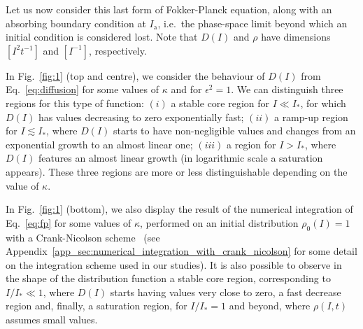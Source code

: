 Let us now consider this last form of Fokker-Planck equation, along with an absorbing boundary condition at $I_{\mathrm{a}}$, i.e.\ the phase-space limit beyond which an initial condition is considered lost. Note that $D(I)$ and $\rho$ have dimensions $[I^2t^{-1}]$ and $[I^{-1}]$, respectively.

In Fig.~\ref{fig:1} (top and centre), we consider the behaviour of $D(I)$ from Eq.~\eqref{eq:diffusion} for some values of $\kappa$ and for $\epsilon^2 = 1$. We can distinguish three regions for this type of function: $(i)$ a stable core region for $I \ll I_\ast$, for which $D(I)$ has values decreasing to zero exponentially fast; $(ii)$ a ramp-up region for $I \lesssim I_\ast$, where $D(I)$ starts to have non-negligible values and changes from an exponential growth to an almost linear one; $(iii)$ a region for $I >  I_\ast$, where $D(I)$ features an almost linear growth (in logarithmic scale a saturation appears). These three regions are more or less distinguishable depending on the value of $\kappa$. 

In Fig.~\ref{fig:1} (bottom), we also display the result of the numerical integration of Eq.~\eqref{eq:fp} for some values of $\kappa$, performed on an initial distribution $\rho_0(I)=1$ with a Crank-Nicolson scheme~\cite{crank1947practical} (see Appendix~\ref{app_sec:numerical_integration_with_crank_nicolson} for some detail on the integration scheme used in our studies).
It is also possible to observe in the shape of the distribution function a stable core region, corresponding to $I/I_\ast \ll 1$, where $D(I)$ starts having values very close to zero, a fast decrease region and, finally, a saturation region, for $I/I_\ast = 1$ and beyond, where $\rho(I, t)$ assumes small values.

